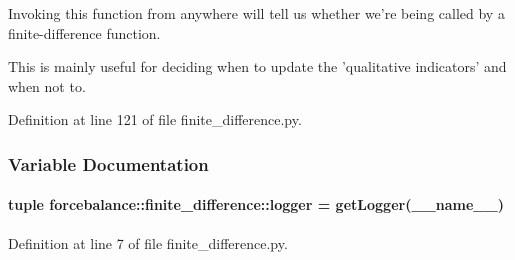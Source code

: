 \-Invoking this function from anywhere will tell us whether we're being called by a finite-\/difference function. 

\-This is mainly useful for deciding when to update the 'qualitative indicators' and when not to. 

\-Definition at line 121 of file finite\-\_\-difference.\-py.



\subsubsection{\-Variable \-Documentation}
\hypertarget{namespaceforcebalance_1_1finite__difference_a2cc51d8d8a349134f3a8862a21bfb694}{
\paragraph[{logger}]{\setlength{\rightskip}{0pt plus 5cm}tuple {\bf forcebalance\-::finite\-\_\-difference\-::logger} = get\-Logger(\-\_\-\-\_\-name\-\_\-\-\_\-)}}\label{namespaceforcebalance_1_1finite__difference_a2cc51d8d8a349134f3a8862a21bfb694}


\-Definition at line 7 of file finite\-\_\-difference.\-py.


